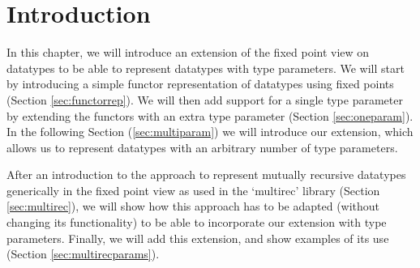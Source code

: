 \section{Introduction}


In this chapter, we will introduce an extension of the fixed point
view on datatypes to be able to represent datatypes with type
parameters. We will start by introducing a simple functor
representation of datatypes using fixed points (Section
\ref{sec:functorrep}). We will then add support for a single type
parameter by extending the functors with an extra type parameter
(Section \ref{sec:oneparam}). In the following Section
(\ref{sec:multiparam}) we will introduce our extension, which allows
us to represent datatypes with an arbitrary number of type parameters.

After an introduction to the approach to represent mutually recursive
datatypes generically in the fixed point view \cite{multirec} as used
in the `multirec' library (Section \ref{sec:multirec}), we will show
how this approach has to be adapted (without changing its
functionality) to be able to incorporate our extension with type
parameters. Finally, we will add this extension, and show examples of
its use (Section \ref{sec:multirecparams}).
